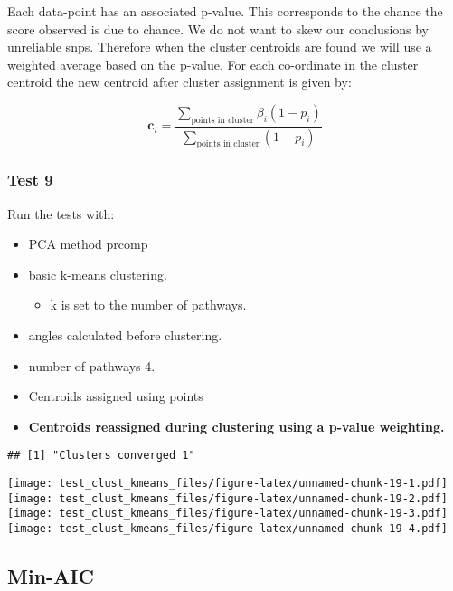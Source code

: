 \documentclass[
]{article}
\providecommand{\tightlist}{%
  \setlength{\itemsep}{0pt}\setlength{\parskip}{0pt}}
\begin{document}
Each data-point has an associated p-value. This corresponds to the
chance the score observed is due to chance. We do not want to skew our
conclusions by unreliable snps. Therefore when the cluster centroids are
found we will use a weighted average based on the p-value. For each
co-ordinate in the cluster centroid the new centroid after cluster
assignment is given by:

\[
\pmb{c}_i = \frac{\sum_{\text{points in cluster}}\beta_i(1-p_i)}{\sum_{\text{points in cluster}}(1-p_i)}
\]

\hypertarget{test9}{%
\subsubsection{Test 9}\label{test9}}

Run the tests with:

\begin{itemize}
\tightlist
\item
  PCA method prcomp
\item
  basic k-means clustering.

  \begin{itemize}
  \tightlist
  \item
    k is set to the number of pathways.
  \end{itemize}
\item
  angles calculated before clustering.
\item
  number of pathways 4.
\item
  Centroids assigned using points
\item
  \textbf{Centroids reassigned during clustering using a p-value
  weighting.}
\end{itemize}

\begin{verbatim}
## [1] "Clusters converged 1"
\end{verbatim}

\texttt{[image: test\_clust\_kmeans\_files/figure-latex/unnamed-chunk-19-1.pdf]}
\texttt{[image: test\_clust\_kmeans\_files/figure-latex/unnamed-chunk-19-2.pdf]}
\texttt{[image: test\_clust\_kmeans\_files/figure-latex/unnamed-chunk-19-3.pdf]}
\texttt{[image: test\_clust\_kmeans\_files/figure-latex/unnamed-chunk-19-4.pdf]}

\hypertarget{min-aic}{%
\subsection{Min-AIC}\label{min-aic}}
\end{document}
